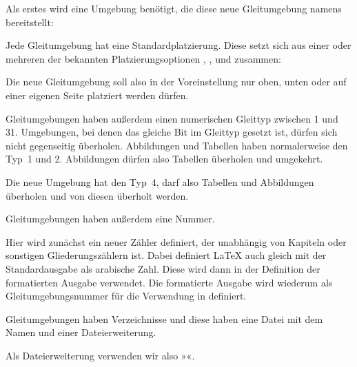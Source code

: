 Als erstes wird eine Umgebung benötigt, die diese neue
Gleitumgebung \iftrue%
namens  bereitstellt:%
\else%
bereitstellt. Das geht ganz einfach mit:%
\fi%
\begin{lstcode}
  \newenvironment{remarkbox}%
    {\@float{remarkbox}}%
    {\end@float}
\end{lstcode}
%

Jede Gleitumgebung hat eine Standardplatzierung. Diese
setzt sich aus einer oder mehreren der bekannten Platzierungsoptionen
, ,  und  zusammen:
\begin{lstcode}
  \newcommand*{\fps@remarkbox}{tbp}
\end{lstcode}
Die neue Gleitumgebung soll also in der Voreinstellung nur oben, unten oder
auf einer eigenen Seite platziert werden dürfen.

Gleitumgebungen haben außerdem einen numerischen Gleittyp
zwischen 1 und 31. Umgebungen, bei denen das gleiche Bit
im Gleittyp gesetzt ist, dürfen sich nicht gegenseitig überholen. Abbildungen
und Tabellen haben normalerweise den Typ~1 und 2. Abbildungen dürfen also
Tabellen überholen und umgekehrt.
\begin{lstcode}
  \newcommand*{\ftype@remarkbox}{4}
\end{lstcode}
Die neue Umgebung hat den Typ~4, darf also Tabellen und Abbildungen überholen
und von diesen überholt werden.

Gleitumgebungen haben außerdem eine Nummer.
\begin{lstcode}
  \newcommand*{\remarkboxformat}{%
    Merksatz~\theremarkbox\csname autodot\endcsname
  }
  \newcommand*{\fnum@remarkbox}{\remarkboxformat}
\end{lstcode}
Hier wird zunächst ein neuer Zähler definiert, der unabhängig von Kapiteln
oder sonstigen Gliederungszählern ist. Dabei definiert \LaTeX{} auch gleich
 mit der Standardausgabe als arabische Zahl. Diese wird
dann in der Definition der formatierten Ausgabe verwendet. Die formatierte
Ausgabe wird wiederum als Gleitumgebungsnummer für die Verwendung in
 definiert.

Gleitumgebungen haben Verzeichnisse und diese haben
eine Datei mit dem Namen  und einer Dateierweiterung.
\begin{lstcode}
  \newcommand*{\ext@remarkbox}{lor}
\end{lstcode}
Als Dateierweiterung verwenden wir also »«.

